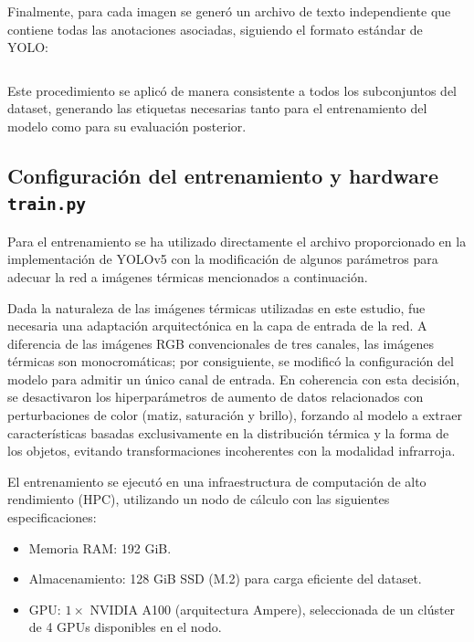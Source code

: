 \documentclass{article}
\begin{document}
	Finalmente, para cada imagen se generó un archivo de texto independiente que contiene todas las anotaciones asociadas, siguiendo el formato estándar de YOLO:
	
	\begin{equation}
		[\text{clase},x_{\text{centro}}^{\text{norm}}, y_{\text{centro}}^{\text{norm}}, w_{\text{caja}}^{\text{norm}}, h_{\text{caja}}^{\text{norm}}]
	\end{equation}
	
	
	
	Este procedimiento se aplicó de manera consistente a todos los subconjuntos del dataset, generando las etiquetas necesarias tanto para el entrenamiento del modelo como para su evaluación posterior.
	\newpage
	\subsection{Configuración del entrenamiento y hardware \texttt{train.py}}
	Para el entrenamiento se ha utilizado directamente el archivo proporcionado en la implementación de YOLOv5 con la modificación de algunos parámetros para adecuar la red a imágenes térmicas mencionados a continuación.
	
	Dada la naturaleza de las imágenes térmicas utilizadas en este estudio, fue necesaria una adaptación arquitectónica en la capa de entrada de la red. A diferencia de las imágenes RGB convencionales de tres canales, las imágenes térmicas son monocromáticas; por consiguiente, se modificó la configuración del modelo para admitir un único canal de entrada. En coherencia con esta decisión, se desactivaron los hiperparámetros de aumento de datos relacionados con perturbaciones de color (matiz, saturación y brillo), forzando al modelo a extraer características basadas exclusivamente en la distribución térmica y la forma de los objetos, evitando transformaciones incoherentes con la modalidad infrarroja.
	
	El entrenamiento se ejecutó en una infraestructura de computación de alto rendimiento (HPC), utilizando un nodo de cálculo con las siguientes especificaciones:
	
	\begin{itemize}
		\item Memoria RAM: 192 GiB.
		\item Almacenamiento: 128 GiB SSD (M.2) para carga eficiente del dataset.
		\item GPU: $1 \times$ NVIDIA A100 (arquitectura Ampere), seleccionada de un clúster de 4 GPUs disponibles en el nodo.
	\end{itemize}
	
\end{document}
